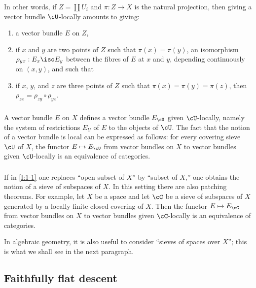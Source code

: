 In other words, if $Z=\coprod U_i$ and $\pi:Z\to X$ is the natural
projection, then giving a vector bundle $\cU$-locally amounts to giving:
\begin{enumerate}[\indent a)]
  \item a vector bundle $E$ on $Z$,
  \item if $x$ and $y$ are two points of $Z$ such that
    $\pi(x)=\pi(y)$, an isomorphism $\rho_{yx}:E_x\iso E_y$ between the
    fibres of $E$ at $x$ and $y$, depending continuously on $(x,y)$,
    and such that
  \item if $x$, $y$, and $z$ are three points of $Z$ such that
    $\pi(x)=\pi(y)=\pi(z)$, then
    $\rho_{zx}=\rho_{zy}\circ\rho_{yx}$.
\end{enumerate}

\subsubsection{}\label{I:1-3-3}

A vector bundle $E$ on $X$ defines a vector bundle $E_\cU$ given
$\cU$-locally, namely the system of restrictions $E_U$ of $E$ to the
objects of $\cU$. The fact that the notion of a vector bundle is local can
be expressed as follows: for every covering sieve $\cU$ of $X$, the
functor $E\mapsto E_\cU$ from vector bundles on $X$ to vector bundles
given $\cU$-locally is an equivalence of categories.

\subsubsection{}\label{I:1-3-4}

If in \ref{I:1-1} one replaces “open subset of $X$” by “subset of $X$,”
one obtains the notion of a sieve of subspaces of $X$. In this setting
there are also patching theorems. For example, let $X$ be a space and
let $\cC$ be a sieve of subspaces of $X$ generated by a locally finite
closed covering of $X$. Then the functor $E\mapsto E_\cC$ from vector
bundles on $X$ to vector bundles given $\cC$-locally is an equivalence
of categories.

In algebraic geometry, it is also useful to consider “sieves of spaces
over $X$”; this is what we shall see in the next paragraph.

\subsection{Faithfully flat descent}\label{I:1-4}

